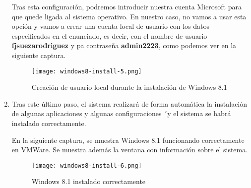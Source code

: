 \begin{enumerate}
    Tras esta configuración, podremos introducir nuestra cuenta Microsoft para que quede ligada al sistema operativo. En nuestro caso, no vamos a usar esta opción y vamos a crear una cuenta local de usuario con los datos especificados en el enunciado, es decir, con el nombre de usuario \textbf{fjsuezarodriguez} y pa contraseña \textbf{admin2223}, como podemos ver en la siguiente captura.

    \begin{figure}[H]
        \centering
        \texttt{[image: windows8-install-5.png]}
        \caption{Creación de usuario local durante la instalación de Windows 8.1}
    \end{figure}

    \item Tras este último paso, el sistema realizará de forma automática la instalación de algunas aplicaciones y algunas configuraciones ´y el sistema se habrá instalado correctamente.

    En la siguiente captura, se muestra Windows 8.1 funcionando correctamente en VMWare. Se muestra además la ventana con información sobre el sistema.

    \begin{figure}[H]
        \centering
        \texttt{[image: windows8-install-6.png]}
        \caption{Windows 8.1 instalado correctamente}
    \end{figure}
\end{enumerate}





\newpage



